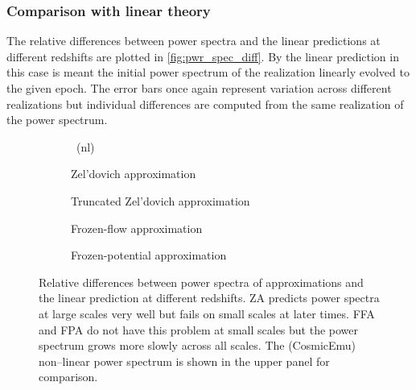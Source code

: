 \subsubsection{Comparison with linear theory}
The relative differences between power spectra and the linear predictions at different redshifts are plotted in \autoref{fig:pwr_spec_diff}. By the linear prediction in this case is meant the initial power spectrum of the realization linearly evolved to the given epoch. The error bars once again represent variation across different realizations but individual differences are computed from the same realization of the power spectrum.
\begin{figure*}[!hbt]
\centering
	\begin{subfigure}{1.0\textwidth}
	\end{subfigure}
	\begin{subfigure}{0.5\textwidth}
		\caption{\LCDM\ (nl)}	
	\end{subfigure}
	\begin{subfigure}{0.5\textwidth}
		\caption{Zel'dovich approximation}
	\end{subfigure}%
	\begin{subfigure}{0.5\textwidth}
		\caption{Truncated Zel'dovich approximation}
	\end{subfigure}
	\begin{subfigure}{0.5\textwidth}
		\caption{Frozen-flow approximation}
	\end{subfigure}%
	\begin{subfigure}{0.5\textwidth}
		\caption{Frozen-potential approximation}
	\end{subfigure}
	\caption{Relative differences between power spectra of approximations and the linear prediction at different redshifts. ZA predicts power spectra at large scales very well but fails on small scales at later times. FFA and FPA do not have this problem at small scales but the power spectrum grows more slowly across all scales. The (CosmicEmu) non--linear power spectrum is shown in the upper panel for comparison.}
	\label{fig:pwr_spec_diff}
\end{figure*}

